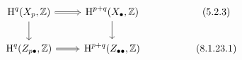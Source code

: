 \documentclass[crop,dvisvgm]{standalone}
\begin{document}
\[\begin {tikzcd}
    \operatorname {H}^q(X_p,\mathbb {Z})
      \ar [r,Rightarrow]
      \ar [d]
    & \operatorname {H}^{p+q}(X_\bullet ,\mathbb {Z})
      \ar [d]
    && (5.2.3)
  \\\operatorname {H}^q(Z_{p\bullet },\mathbb {Z})
      \ar [r,Rightarrow]
    & \operatorname {H}^{p+q}(Z_{\bullet \bullet },\mathbb {Z})
    && (8.1.23.1)
  \end {tikzcd}\]
\end{document}
